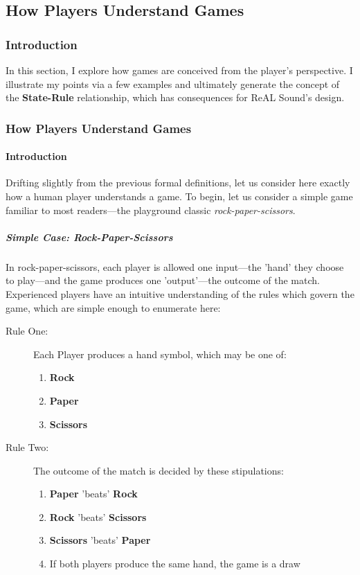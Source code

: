 \documentclass{report}
\newcommand{\rs}{ReAL Sound\xspace}
\newcommand{\state}[1]{\textbf{#1}}
\begin{document}
\subsection{How Players Understand Games}

\subsubsection{Introduction}
In this section, I explore how games are conceived from the player's perspective. I illustrate my points via a few examples and ultimately generate the concept of the \state{State-Rule} relationship, which has consequences for \rs's design.
 
\subsubsection{How Players Understand Games}

\paragraph{Introduction}

Drifting slightly from the previous formal definitions, let us consider here exactly how a human player understands a game. To begin, let us consider a simple game familiar to most readers---the playground classic \emph{rock-paper-scissors}. 

\subparagraph{Simple Case: \emph{Rock-Paper-Scissors}}

In rock-paper-scissors, each player is allowed one input---the 'hand' they choose to play---and the game produces one 'output'---the outcome of the match. Experienced players have an intuitive understanding of the rules which govern the game, which are simple enough to enumerate here:

\begin{description}
    \item [Rule One:] Each Player produces a hand symbol, which may be one of:
        \begin{enumerate}
            \item \state{Rock}
            \item \state{Paper}
            \item \state{Scissors}
        \end{enumerate}
    \item [Rule Two:] The outcome of the match is decided by these stipulations:
        \begin{enumerate}
            \item \state{Paper} 'beats' \state{Rock}
            \item \state{Rock} 'beats' \state{Scissors}
            \item \state{Scissors} 'beats' \state{Paper}
            \item If both players produce the same hand, the game is a draw
        \end{enumerate}
\end{description}
\end{document}
